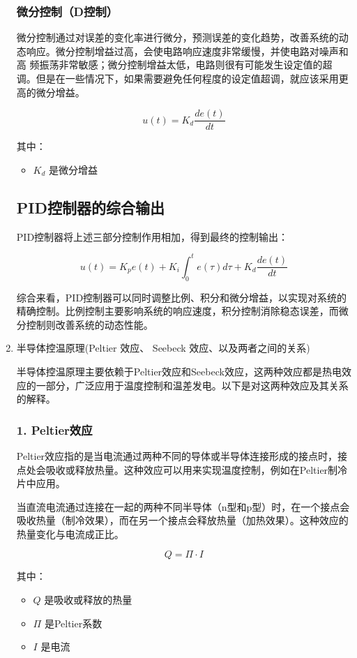 \documentclass[dvipsnames, svgnames,a4paper,11pt]{article}
\begin{document}
\begin{enumerate}
\subsubsection*{ 微分控制（D控制）}

微分控制通过对误差的变化率进行微分，预测误差的变化趋势，改善系统的动态响应。微分控制增益过高，会使电路响应速度非常缓慢，并使电路对噪声和高
频振荡非常敏感；微分控制增益太低，电路则很有可能发生设定值的超调。但是在一些情况下，如果需要避免任何程度的设定值超调，就应该采用更高的微分增益。

\[
u(t) = K_d \frac{de(t)}{dt}
\]

其中：
\begin{itemize}
    \item \(K_d\) 是微分增益
\end{itemize}

\subsection*{PID控制器的综合输出}

PID控制器将上述三部分控制作用相加，得到最终的控制输出：

\[
u(t) = K_p e(t) + K_i \int_{0}^{t} e(\tau) d\tau + K_d \frac{de(t)}{dt}
\]

综合来看，PID控制器可以同时调整比例、积分和微分增益，以实现对系统的精确控制。比例控制主要影响系统的响应速度，积分控制消除稳态误差，而微分控制则改善系统的动态性能。

\item 半导体控温原理(Peltier 效应、 Seebeck 效应、以及两者之间的关系)

半导体控温原理主要依赖于Peltier效应和Seebeck效应，这两种效应都是热电效应的一部分，广泛应用于温度控制和温差发电。以下是对这两种效应及其关系的解释。

\subsubsection*{1. Peltier效应}
Peltier效应指的是当电流通过两种不同的导体或半导体连接形成的接点时，接点处会吸收或释放热量。这种效应可以用来实现温度控制，例如在Peltier制冷片中应用。

当直流电流通过连接在一起的两种不同半导体（n型和p型）时，在一个接点会吸收热量（制冷效果），而在另一个接点会释放热量（加热效果）。这种效应的热量变化与电流成正比。

\[
Q = \Pi \cdot I
\]

其中：
\begin{itemize}
    \item \(Q\) 是吸收或释放的热量
    \item \(\Pi\) 是Peltier系数
    \item \(I\) 是电流
\end{itemize}


\end{enumerate}
\end{document}
